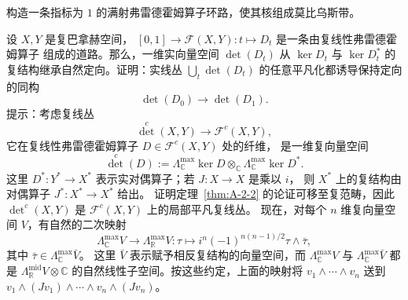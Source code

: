 \begin{exercise}\label{ex:A-2-6}
构造一条指标为 $1$ 的满射弗雷德霍姆算子环路，使其核组成莫比乌斯带。
\end{exercise}

\begin{exercise}\label{ex:A-2-7}
设 $X,Y$ 是复巴拿赫空间，
$[0,1]\to\mathcal F(X,Y):t\mapsto D_t$ 是一条由复线性弗雷德霍姆算子
组成的道路。那么，一维实向量空间 $\det(D_t)$ 从 $\ker D_t$ 与
$\ker D_t^*$ 的复结构继承自然定向。证明：实线丛
$\bigcup_t\det(D_t)$ 的任意平凡化都诱导保持定向的同构
\[
  \det(D_0)\longrightarrow\det(D_1).
\]
提示：考虑复线丛
\[
  \det^c(X,Y)\longrightarrow\mathcal F^c(X,Y),
\]
它在复线性弗雷德霍姆算子 $D\in\mathcal F^c(X,Y)$ 处的纤维，
是一维复向量空间
\[
  \det^c(D):=\Lambda_{\mathbb C}^{\max}\ker D
  \otimes_{\mathbb C}\Lambda_{\mathbb C}^{\max}\ker D^*.
\]
这里 $D^*:Y^*\to X^*$ 表示实对偶算子；若 $J:X\to X$ 是乘以 $i$，
则 $X^*$ 上的复结构由对偶算子 $J^*:X^*\to X^*$ 给出。
证明定理~\ref{thm:A-2-2} 的论证可移至复范畴，因此
$\det^c(X,Y)$ 是 $\mathcal F^c(X,Y)$ 上的局部平凡复线丛。
现在，对每个 $n$ 维复向量空间 $V$，有自然的二次映射
\[
  \Lambda_{\mathbb C}^{\max}V\longrightarrow\Lambda_{\mathbb R}^{\max}V:
  \tau\longmapsto i^n(-1)^{n(n-1)/2}\tau\wedge\bar\tau,
\]
其中 $\bar\tau\in\Lambda_{\mathbb C}^{\max}\bar V$。
这里 $\bar V$ 表示赋予相反复结构的向量空间，而
$\Lambda_{\mathbb C}^{\max}V$ 与
$\Lambda_{\mathbb C}^{\max}\bar V$ 都是
$\Lambda_{\mathbb R}^{\mathrm{mid}}V\otimes\mathbb C$
的自然线性子空间。按这些约定，上面的映射将
$v_1\wedge\cdots\wedge v_n$ 送到
$v_1\wedge(Jv_1)\wedge\cdots\wedge v_n\wedge(Jv_n)$。
\end{exercise}
